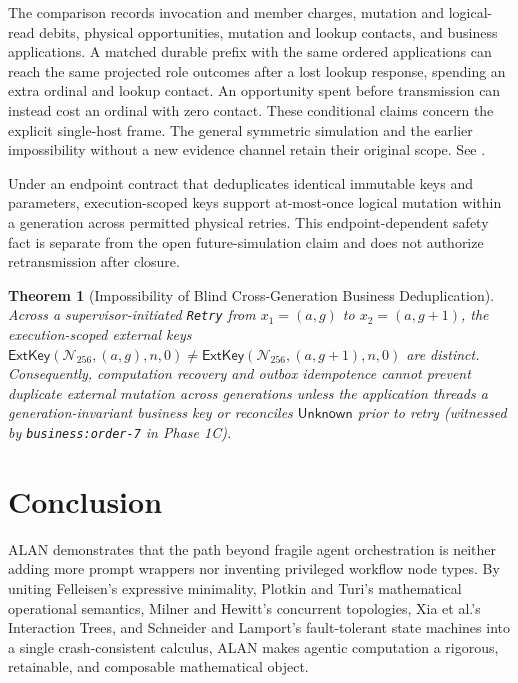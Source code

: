 \documentclass[11pt,a4paper]{article}
\newtheorem{theorem}{Theorem}[section]
\theoremstyle{definition}
\theoremstyle{remark}
\begin{document}
The comparison records invocation and member charges, mutation and logical-read debits, physical opportunities, mutation and lookup contacts, and business applications. A matched durable prefix with the same ordered applications can reach the same projected role outcomes after a lost lookup response, spending an extra ordinal and lookup contact. An opportunity spent before transmission can instead cost an ordinal with zero contact. These conditional claims concern the explicit single-host frame. The general symmetric simulation and the earlier impossibility without a new evidence channel retain their original scope. See .

Under an endpoint contract that deduplicates identical immutable keys and parameters, execution-scoped keys support at-most-once logical mutation within a generation across permitted physical retries. This endpoint-dependent safety fact is separate from the open future-simulation claim and does not authorize retransmission after closure.

\begin{theorem}[Impossibility of Blind Cross-Generation Business Deduplication]
\label{thm:crossgen}
Across a supervisor-initiated \texttt{Retry} from $x_1 = (a, g)$ to $x_2 = (a, g+1)$, the execution-scoped external keys $\mathsf{ExtKey}(\mathcal{N}_{256}, (a, g), n, 0) \ne \mathsf{ExtKey}(\mathcal{N}_{256}, (a, g+1), n, 0)$ are distinct. Consequently, computation recovery and outbox idempotence cannot prevent duplicate external mutation across generations unless the application threads a generation-invariant business key or reconciles $\mathsf{Unknown}$ prior to retry (witnessed by \texttt{business:order-7} in Phase 1C).
\end{theorem}

\section{Conclusion}
ALAN demonstrates that the path beyond fragile agent orchestration is neither adding more prompt wrappers nor inventing privileged workflow node types. By uniting Felleisen's expressive minimality, Plotkin and Turi's mathematical operational semantics, Milner and Hewitt's concurrent topologies, Xia et al.'s Interaction Trees, and Schneider and Lamport's fault-tolerant state machines into a single crash-consistent calculus, ALAN makes agentic computation a rigorous, retainable, and composable mathematical object.
\end{document}
